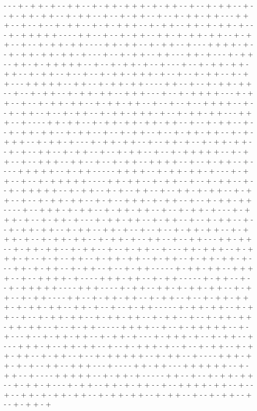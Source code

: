 - - - + - + + - + - - + + - - + - + + - + + + - + - + + - - + - - + - + + - - + - - + - + + - + + - - + - + + - - + - - + - + + - - + - - + - + + - + + - - - + + + - - + - - + - - + - + + - - + - + - + + + - - + - + + - - + + - + - + + - + - - - + - + + + + + - - - - + + - - + - - + - + + - - + + - + - + + - + + - - + - + + - - + - - + - + + - + + - - - - + + - + + - - + - + + - - + - - - + + + + - + - - + - + + - + + - + + - + - - - + - - + - + + - - + + - - - + + - + - - - + - + + - - + + - + - + + + + + - - + - - + - + + - + - - + - - - + - - + - + + - + + - + + - - + - + + - - + - - + - - + - + + - + + + - + - - + - - + - + + - - + - + + - - - + + + + + - - + + - - + - + + - + + - - - - + + - - + - - + - + + - + + - - + - - + - + + - - + - + + - + + - - + + + - - - + - - + - + + + + - - - + - + + - - + - - + - + + - + + - - + - + + - + + - - + - - + - - + - - + + + + - - + - - + - + + - - + - - + - + + - - + - + + - + + + - + - - + - + + - + + - - - + + + - - + - - - - + + - + + - - + - + + - + + - + + - + + - - + - - + - + + - - + - - + - + + - + + - - + - + + - - + - - + - + + - - + - - + - + + - + + - - + - + - + + + - - + - + + - + - - - + - + + - + + - - + - - + + - + - - + - + + - + + - - + - + - - + + - - + - + + - - + - - + - + + - - + - - + - + + + + + - - + - + + - - + - - + + + - - + + - - + - - + - + + - - + + + + - - + - - + - + + - - + - - - - + + + + + - - + - + + - - - - - + + + + - - + - + + - + + - + - - - + - + + - - + - - + - + + + + + - - - - + + - + + - - + - + + - - + - - + - + + - - + - - + - + + + + + - - + - + + - - + - + - - + + - - + - - + + - + - + + - - + - + + - - + - - + - + + - + + - - + - + - - + + + - + - + + - - + - - + - + + - + + - - - - + - - + + + - + - + + - - + - + + - + + - - + - - + - + + - + - - - + - + + + - + - - + - + + - + - - - + - + + - + + - - + - + + - - + - - + - + + - - + - - + - + + - + + - - + - + + - - + + - + - - + - - + - - + - + + - + + - - + - + + + - + - - + - + + - + + - - + - + + - + - - + + - - + - - + + - - - + + - + + - - + - + + - + + - - + - + + - - + - - + - + + - - + - - - + + - + + + - - + - + + + - + - - + - + - - + + - - + - + + - + + - - + - + + - - + - + + - + + - + - - - + + - + - + + - - + - + + - - + - - + - + + - - - - - + - + + - + + - - + + + + - - + - - + + + + - + - - - - + + + - + + - - + - + + - - - - - + - + + - - + - - + - + + + + + - - - - + + + - - - - + - + + - - + + - + - + + - + + - - + - + + - - + - + + - - - - + + - - + - + + - + + - - + - + + - - + - - + - + + - + + + - + - + + - + + - - + + - + - - + - - + - + + - - - - - + - + + - + + - - + - + + - - + - - + - + + - + + - - + - + + - + + - - + - + + - - + - - + - + + - + + - + + - + + - - + - - + - + + - - - - - + + + + - - + - - + - + + + + + - - + - + - - - + - - + - + + - + + - - + - + + - + - - - + - + + + - + - - + - + + - - + - - - + + + - + - - + + - + + - - + - - + - + + + - + - - + - - + - + + - - + - + + - + + - - + - + + - - + - - + - + + + + + - - + - + + - - + - - - - + + + - + + - + - + - - + + - - + + + - - - + - - - - + + - + + - - - + + + + + + - - + - + + - - + - - - - + + + + + - - + - + + - + - - - - - + + - - + - - + - + + - + + - - + - + + - + - - - + - + + - - + + - + - + + - - + - - + + + + - + + - - + - - + - - + + - + - + + - + + - - + - + + - + + - - + - + + - - + - - + - + + - - + - - + - + + - + 